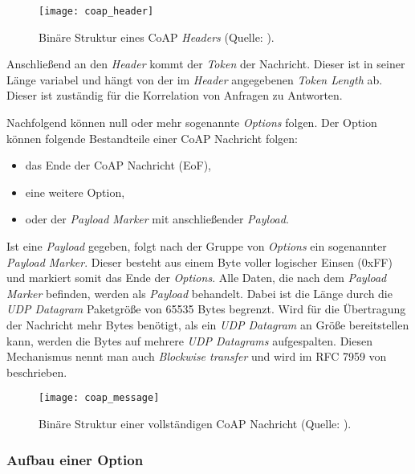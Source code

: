 \begin{figure}[h]
    \centering
    \texttt{[image: coap\_header]}
    \caption{Binäre Struktur eines CoAP \textit{Headers} (Quelle: \autocite{RFC7252}).}
    \label{fig:binaere-sturktur-eines-coap-headers}
\end{figure}

Anschließend an den \textit{Header} kommt der \textit{Token} der Nachricht. Dieser ist in seiner Länge variabel und hängt von der im \textit{Header} angegebenen \textit{Token Length} ab. Dieser ist zuständig für die Korrelation von Anfragen zu Antworten.

Nachfolgend können null oder mehr sogenannte \textit{Options} folgen. Der Option können folgende Bestandteile einer CoAP Nachricht folgen:
\begin{itemize}
    \item das Ende der CoAP Nachricht (EoF),
    \item eine weitere Option,
    \item oder der \textit{Payload Marker} mit anschließender \textit{Payload}.
\end{itemize}

Ist eine \textit{Payload} gegeben, folgt nach der Gruppe von \textit{Options} ein sogenannter \textit{Payload Marker}. Dieser besteht aus einem Byte voller logischer Einsen (0xFF) und markiert somit das Ende der \textit{Options}. Alle Daten, die nach dem \textit{Payload Marker} befinden, werden als \textit{Payload} behandelt. Dabei ist die Länge durch die \textit{UDP Datagram} Paketgröße von 65535 Bytes begrenzt. Wird für die Übertragung der Nachricht mehr Bytes benötigt, als ein \textit{UDP Datagram} an Größe bereitstellen kann, werden die Bytes auf mehrere \textit{UDP Datagrams} aufgespalten. Diesen Mechanismus nennt man auch \textit{Blockwise transfer} und wird im RFC 7959 von \citeauthor{RFC7959} \cite{RFC7959} beschrieben.

\begin{figure}[h]
    \centering
    \texttt{[image: coap\_message]}
    \caption{Binäre Struktur einer vollständigen CoAP Nachricht (Quelle: \autocite{RFC7252}).}
    \label{fig:binaere-sturktur-einer-vollstaendigen-coap-nachricht}
\end{figure}

\subsubsection{Aufbau einer Option}
\label{subsubsec:aufbau-einer-option}

